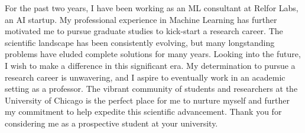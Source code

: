 \documentclass{article}
\begin{document}
For the past two years, I have been working as an ML consultant at Relfor Labs,
an AI startup. My professional experience in Machine Learning has further
motivated me to pursue graduate studies to kick-start a research career. The
scientific landscape has been consistently evolving, but many longstanding
problems have eluded complete solutions for many years. Looking into the future,
I wish to make a difference in this significant era. My determination to pursue
a research career is unwavering, and I aspire to eventually work in an academic
setting as a professor. The vibrant community of students and researchers at the
University of Chicago is the perfect place for me to nurture myself and further
my commitment to help expedite this scientific advancement. Thank you for
considering me as a prospective student at your university.
\end{document}

